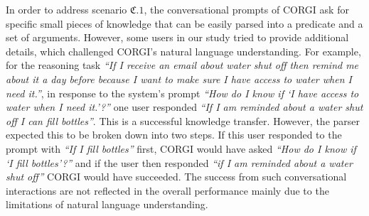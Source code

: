 In order to address scenario $\mathfrak{C}.1$, the conversational prompts of CORGI 
ask for specific small pieces of knowledge that can be easily parsed into a predicate and a set of arguments. However, some users in our study tried to provide additional details, which challenged CORGI's natural language understanding. 
For example, for the reasoning task \emph{``If I receive an email about water shut off then remind me about it a day before because I want to make sure I have access to water when I need it.''}, in response to the system's prompt \emph{``How do I know if `I have access to water when I need it.'?''} one user responded \emph{``If I am reminded about a water shut off I can fill bottles''}. This is a successful knowledge transfer. However, the parser expected this to be broken down into two steps. If this user responded to the prompt with \emph{``If I fill bottles''} first, CORGI would have asked \emph{``How do I know if `I fill bottles'?''} and if the user then responded \emph{``if I am reminded about a water shut off''} CORGI would have succeeded. The success from such conversational interactions are not reflected in the overall performance mainly due to the limitations of natural language understanding.%

